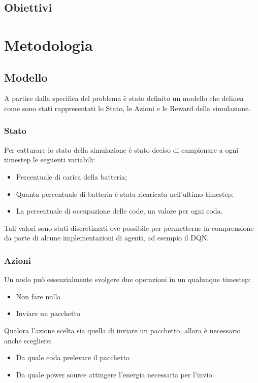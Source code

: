 \documentclass[conference]{IEEEtran}
\begin{document}
\subsection{Obiettivi}

\section{Metodologia}

\subsection{Modello}
A partire dalla specifica del problema è stato definito un modello che delinea come
sono stati rappresentati lo Stato, le Azioni e le Reward della simulazione.

\subsubsection{Stato}
Per catturare lo stato della simulazione è stato deciso di campionare a ogni timestep le
seguenti variabili:
\begin{itemize}
    \item Percentuale di carica della batteria;
    \item Quanta percentuale di batteria è stata ricaricata nell'ultimo timestep;
    \item La percentuale di occupazione delle code, un valore per ogni coda. 
\end{itemize}
Tali valori sono stati discretizzati ove possibile per permetterne la comprensione da
parte di alcune implementazioni di agenti, ad esempio il DQN.
\subsubsection{Azioni}
Un nodo può essenzialmente svolgere due operazioni in un qualunque timestep:
\begin{itemize}
    \item Non fare nulla
    \item Inviare un pacchetto
\end{itemize}
Qualora l'azione scelta sia quella di inviare un pacchetto, allora è necessario anche
scegliere:
\begin{itemize}
    \item Da quale coda prelevare il pacchetto
    \item Da quale power source attingere l'energia necessaria per l'invio
\end{itemize}
\end{document}
